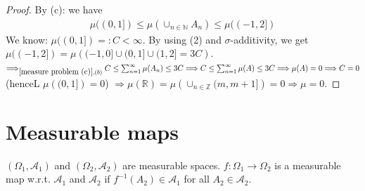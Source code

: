 \documentclass[../../note.tex]{subfiles}
\begin{document}
\begin{proof}
    By (c): 
    we have 
    \begin{align}
        \label{measure problem (c)}
        \mu((0,1]) \leq \mu(\cup_{n \in \mathbb{N}} A_n) \leq \mu((-1,2])
    \end{align}
    We know: $\mu((0,1]) =: C < \infty $. By using (2) and $\sigma$-additivity, we get $\mu((-1,2]) = \mu\left((-1,0] \cup (0,1] \cup (1,2] = 3 C\right)$. $\Longrightarrow_{\ref{measure problem (c)}, (b)} C \leq \sum_{n=1}^{\infty} \mu(A_n) \leq 3 C \Longrightarrow C \leq \sum_{n=1}^{\infty} \mu(A) \leq 3 C \Longrightarrow \mu(A) = 0 \Longrightarrow C=0$(henceL $\mu\left((0,1]\right)=0$) $\Longrightarrow \mu(\mathbb{R}) = \mu\left(\cup_{n \in \mathbb{Z}}(m,m+1]\right) = 0 \Longrightarrow \mu = 0$. 
\end{proof}

\section{Measurable maps}
\begin{definition}
    $(\Omega_1, \mathcal{A}_1)$ and $(\Omega_2, \mathcal{A}_2)$ are measurable spaces. $f: \Omega_1 \rightarrow \Omega_2$ is a measurable map w.r.t. $\mathcal{A}_1$ and $\mathcal{A}_2$  if $f^{-1}(A_2) \in \mathcal{A}_1$ for all $A_2 \in \mathcal{A}_2$.
\end{definition}
\end{document}

